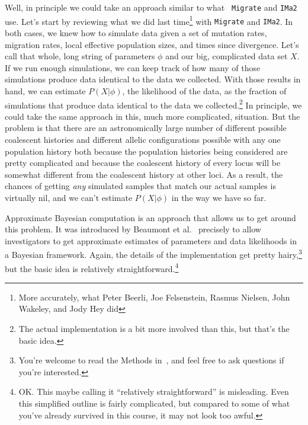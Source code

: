 Well, in principle we could take an approach similar to what {\tt
  Migrate} and {\tt IMa2} use. Let's start by reviewing what we did
last time\footnote{More accurately, what Peter Beerli, Joe
  Felsenstein, Rasmus Nielsen, John Wakeley, and Jody Hey did} with
{\tt Migrate} and {\tt IMa2}. In both cases, we knew how to simulate
data given a set of mutation rates, migration rates, local effective
population sizes, and times since divergence. Let's call that whole,
long string of parameters $\phi$ and our big, complicated data set
$X$. If we run enough simulations, we can keep track of how many of
those simulations produce data identical to the data we
collected. With those results in hand, we can estimate $P(X|\phi)$,
the likelihood of the data, as the fraction of simulations that
produce data identical to the data we collected.\footnote{The actual
  implementation is a bit more involved than this, but that's the
  basic idea.} In principle, we could take the same approach in this,
much more complicated, situation. But the problem is that there are an
astronomically large number of different possible coalescent histories
and different allelic configurations possible with any one population
history both because the population histories being considered are
pretty complicated and because the coalescent history of every locus
will be somewhat different from the coalescent history at other
loci. As a result, the chances of getting {\it any\/} simulated
samples that match our actual samples is virtually nil, and we can't
estimate $P(X|\phi)$ in the way we have so far.

Approximate Bayesian computation is an approach that allows us to get
around this problem. It was introduced by Beaumont et
al.~\cite{Beaumont-etal-2002} precisely to allow investigators to get
approximate estimates of parameters and data likelihoods in a Bayesian
framework. Again, the details of the implementation get pretty
hairy,\footnote{You're welcome to read the Methods
  in~\cite{Beaumont-etal-2002}, and feel free to ask questions if
  you're interested.} but the basic idea is relatively
straightforward.\footnote{OK. This maybe calling it ``relatively
  straightforward'' is misleading. Even this simplified outline is
  fairly complicated, but compared to some of what you've already
  survived in this course, it may not look too awful.}


